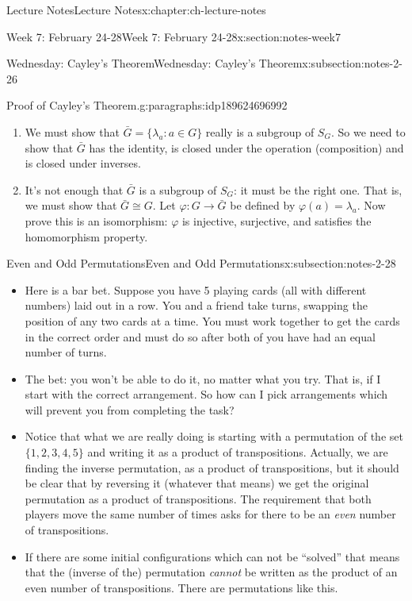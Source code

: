 \documentclass[oneside,11pt,]{book}
\newcommand{\st}{:}
\begin{document}
\begin{chapterptx}{Lecture Notes}{}{Lecture Notes}{}{}{x:chapter:ch-lecture-notes}
\begin{sectionptx}{Week 7: February 24-28}{}{Week 7: February 24-28}{}{}{x:section:notes-week7}
\begin{subsectionptx}{Wednesday: Cayley's Theorem}{}{Wednesday: Cayley's Theorem}{}{}{x:subsection:notes-2-26}
\begin{paragraphs}{Proof of Cayley’s Theorem.}{g:paragraphs:idp189624696992}
\begin{itemize}[label=\textbullet]
\begin{enumerate}
\item{}We must show that \(\bar G = \{\lambda_a \st a \in G\}\) really is a subgroup of \(S_G\).  So we need to show that \(\bar G\) has the identity, is closed under the operation (composition) and is closed under inverses.%
\item{}It's not enough that \(\bar G\) is a subgroup of \(S_G\): it must be the right one.  That is, we must show that \(\bar G \cong G\).  Let \(\varphi:G \to \bar G\) be defined by \(\varphi(a) = \lambda_a\).  Now prove this is an isomorphism: \(\varphi\) is injective, surjective, and satisfies the homomorphism property.%
\end{enumerate}
%
\end{itemize}
%
\end{paragraphs}%
\end{subsectionptx}
%
%
\typeout{************************************************}
\typeout{************************************************}
%
\begin{subsectionptx}{Even and Odd Permutations}{}{Even and Odd Permutations}{}{}{x:subsection:notes-2-28}
%
\begin{itemize}[label=\textbullet]
\item{}Here is a bar bet. Suppose you have 5 playing cards (all with different numbers) laid out in a row. You and a friend take turns, swapping the position of any two cards at a time. You must work together to get the cards in the correct order and must do so after both of you have had an equal number of turns.%
\item{}The bet: you won’t be able to do it, no matter what you try. That is, if I start with the correct arrangement. So how can I pick arrangements which will prevent you from completing the task?%
\item{}Notice that what we are really doing is starting with a permutation of the set \(\{1,2,3,4,5\}\) and writing it as a product of transpositions. Actually, we are finding the inverse permutation, as a product of transpositions, but it should be clear that by reversing it (whatever that means) we get the original permutation as a product of transpositions. The requirement that both players move the same number of times asks for there to be an \emph{even} number of transpositions.%
\item{}If there are some initial configurations which can not be ``solved'' that means that the (inverse of the) permutation \emph{cannot} be written as the product of an even number of transpositions. There are permutations like this.%

\end{itemize}
\end{subsectionptx}
\end{sectionptx}
\end{chapterptx}
\end{document}
